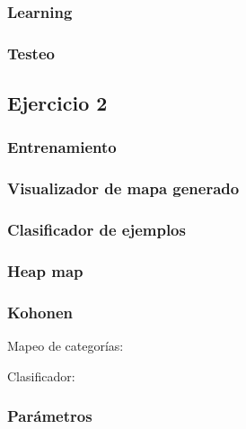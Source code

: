 \documentclass[11pt, a4paper,english,spanish]{article}
\begin{document}


\subsubsection{Learning}



\subsubsection{Testeo}



\subsection{Ejercicio 2}

\subsubsection{Entrenamiento}



\subsubsection{Visualizador de mapa generado}



\subsubsection{Clasificador de ejemplos}



\subsubsection{Heap map}



\subsubsection{Kohonen}



Mapeo de categorías:



Clasificador:



\subsubsection{Parámetros}



\appendix
\end{document}

